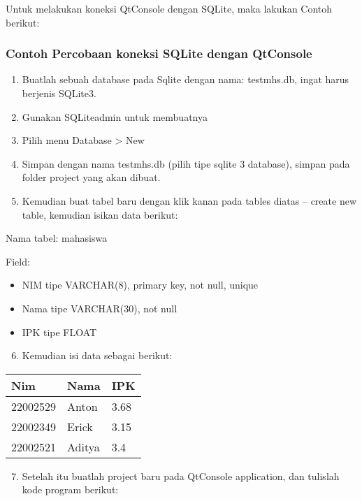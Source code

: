 Untuk melakukan koneksi QtConsole dengan SQLite, maka lakukan Contoh
berikut:

\subsubsection*{Contoh Percobaan koneksi SQLite dengan QtConsole}

\begin{enumerate}


\item
  Buatlah sebuah database pada Sqlite dengan nama: testmhs.db, ingat
  harus berjenis SQLite3.
\item
  Gunakan SQLiteadmin untuk membuatnya
\item
  Pilih menu Database \textgreater{} New
\item
  Simpan dengan nama testmhs.db (pilih tipe sqlite 3 database), simpan
  pada folder project yang akan dibuat.
\item
  Kemudian buat tabel baru dengan klik kanan pada tables diatas --
  create new table, kemudian isikan data berikut:
\end{enumerate}

Nama tabel: mahasiswa

Field:

\begin{itemize}

\item
  NIM tipe VARCHAR(8), primary key, not null, unique
\item
  Nama tipe VARCHAR(30), not null
\item
  IPK tipe FLOAT
\end{itemize}

\begin{enumerate}

\setcounter{enumi}{5}

\item
  Kemudian isi data sebagai berikut:
\end{enumerate}

\begin{longtable}[]{@{}lll@{}}
\toprule
Nim & Nama & IPK\tabularnewline
\midrule
\endhead
22002529 & Anton & 3.68\tabularnewline
22002349 & Erick & 3.15\tabularnewline
22002521 & Aditya & 3.4\tabularnewline
\bottomrule
\end{longtable}

\begin{enumerate}

\setcounter{enumi}{6}

\item
  Setelah itu buatlah project baru pada QtConsole application, dan
  tulislah kode program berikut:
\end{enumerate}

